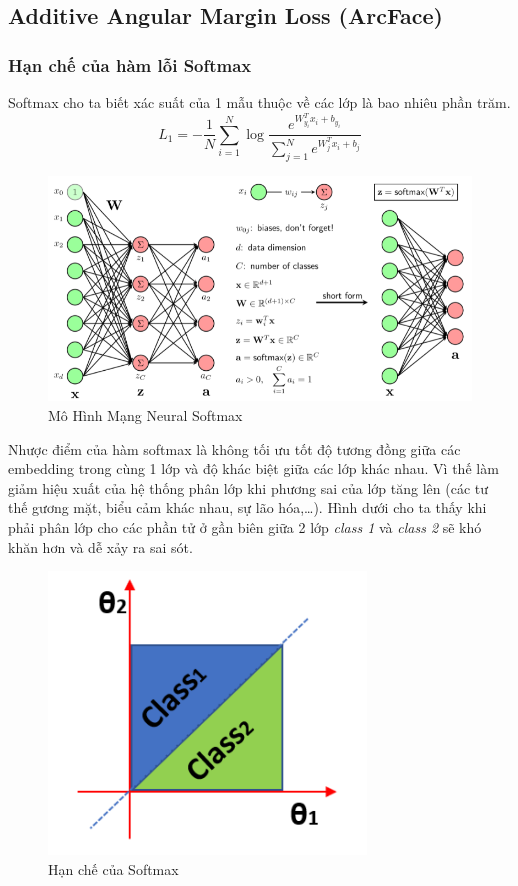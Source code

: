 \documentclass[a4paper, 12pt]{article}
\begin{document}
\subsection{Additive Angular Margin Loss (ArcFace)}
\subsubsection{Hạn chế của hàm lỗi Softmax}

Softmax cho ta biết xác suất của 1 mẫu thuộc về các lớp là bao nhiêu phần trăm.
\begin{equation}
L_1=-\frac{1}{N}\sum_{i=1}^{N}{\log{\frac{e^{W_{y_i}^{T}x_i+b_{y_i}}}{\sum_{j=1}^{N}{e^{W_{j}^{T}x_i+b_{j}}}}}}
\end{equation}

\begin{figure}[H]
    \begin{center}
        \includegraphics[scale=0.4]{img/softmax-img}
        \caption{Mô Hình Mạng Neural Softmax}
    \end{center}
\end{figure}
Nhược điểm của hàm softmax là không tối ưu tốt độ tương đồng giữa các embedding trong cùng 1 lớp và độ khác biệt giữa các lớp khác nhau. Vì thế làm giảm hiệu xuất của hệ thống phân lớp khi phương sai của lớp tăng lên (các tư thế gương mặt, biểu cảm khác nhau, sự lão hóa,\dots). Hình dưới cho ta thấy khi phải phân lớp cho các phần tử ở gần biên giữa 2 lớp \textit{class 1} và \textit{class 2} sẽ khó khăn hơn và dễ xảy ra sai sót.

\begin{figure}[H]
    \begin{center}
        \includegraphics[scale=0.4]{img/softmax-classification}
        \caption{Hạn chế của Softmax}
    \end{center}
\end{figure}
\end{document}
